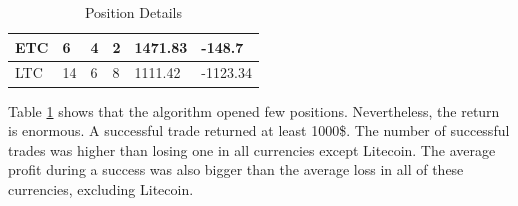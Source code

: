 \documentclass[letterpaper]{article}
\begin{document}
\begin{table}[H]
\begin{tabular}{|l|l|l|l|l|l|}
    ETC                                   & 6                                                                                        & 4                                                                                 & 2                                                                                  & 1471.83                                                                         & -148.7                                                                            \\ \hline
    LTC                                   & 14                                                                                       & 6                                                                                 & 8                                                                                  & 1111.42                                                                         & -1123.34                                                                          \\ \hline
\end{tabular}
\caption{Position Details}
\label{tab:pos-detail}
\end{table}


Table \ref{tab:pos-detail} shows that the algorithm opened few positions. Nevertheless, the return is enormous.
A successful trade returned at least 1000\$. The number of successful trades was higher than losing one in all 
currencies except Litecoin. The average profit during a success was also bigger than the average 
loss in all of these currencies, excluding Litecoin.
\end{document}
